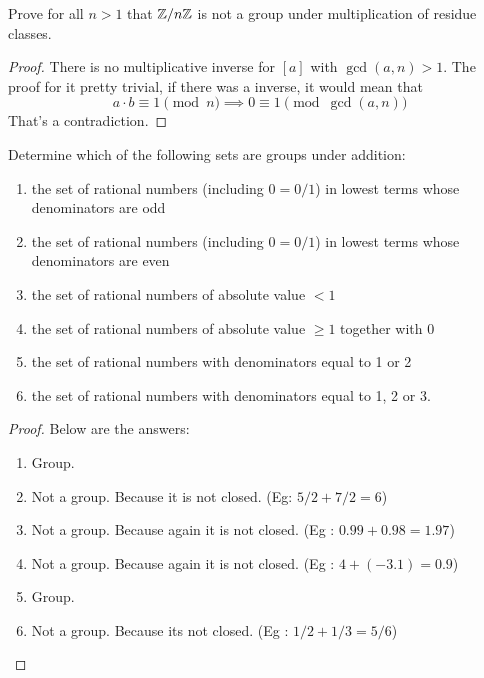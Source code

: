 \begin{problem}
    Prove for all $n > 1$ that $\mathbb{Z}/n\mathbb{Z}$ is not a group under multiplication of residue classes.
\end{problem}

\begin{proof}
    There is no multiplicative inverse for $[a]$ with $\gcd(a,n)>1$. The proof for it pretty trivial,
    if there was a inverse, it would mean that
    \[ a \cdot b \equiv 1 \pmod{n} \implies 0 \equiv 1 \pmod{\gcd(a,n)} \]
    That's a contradiction. 
\end{proof}

\begin{problem}
    Determine which of the following sets are groups under addition:
    \begin{enumerate}
        \item the set of rational numbers (including $0 = 0/1$) in lowest terms whose denominators are odd
        \item the set of rational numbers (including $0 = 0/1$) in lowest terms whose denominators are even
        \item the set of rational numbers of absolute value $< 1$
        \item the set of rational numbers of absolute value $\ge 1$ together with 0
        \item the set of rational numbers with denominators equal to 1 or 2
        \item the set of rational numbers with denominators equal to 1, 2 or 3.
    \end{enumerate}
\end{problem}

\begin{proof}
    Below are the answers: 
    \begin{enumerate}
        \item Group.
        \item Not a group. Because it is not closed. (Eg: $5/2 + 7/2 = 6$)
        \item Not a group. Because again it is not closed. (Eg : $0.99+0.98=1.97$)
        \item Not a group. Because again it is not closed. (Eg : $4+(-3.1)=0.9$)
        \item Group.
        \item Not a group. Because its not closed. (Eg : $1/2+1/3=5/6$)
    \end{enumerate}
\end{proof}

